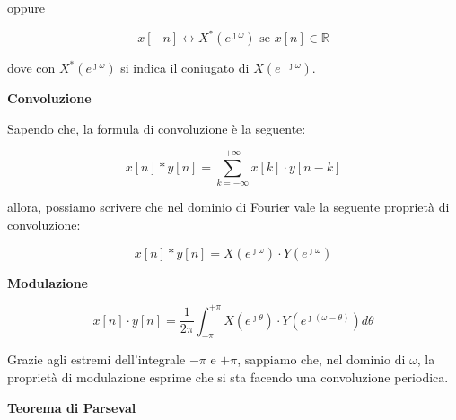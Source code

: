 oppure 

{
    \Large 
    \begin{equation}
        x \left[ -n\right]
        \leftrightarrow
        X^{*} \left(e^{\jmath \omega}\right) 
        \text{ se }
        x \left[ n\right] \in \mathbb{R}
    \end{equation}
}

dove con $X^{*} \left(e^{\jmath \omega}\right)$ si indica il coniugato di $X \left(e^{- \jmath \omega}\right)$. \newline 

\textbf{Convoluzione} \newline 

Sapendo che, la formula di convoluzione è la seguente: 

{
    \Large 
    \begin{equation}
        x \left[ n\right]
        * 
        y \left[ n\right] 
        = 
        \sum_{k = -\infty}^{+ \infty}
        x \left[ k\right] \cdot y \left[ n - k\right]
    \end{equation}
}

allora, possiamo scrivere che nel dominio di Fourier vale la seguente proprietà di convoluzione: 

{
    \Large 
    \begin{equation}
        x \left[ n\right]
        * 
        y \left[ n\right] 
        = 
        X \left( e^{\jmath \omega}\right) 
        \cdot 
        Y \left( e^{\jmath \omega}\right)  
    \end{equation}
}

\newpage 

\textbf{Modulazione} \newline 

{
    \Large 
    \begin{equation}
        x \left[ n\right]
        \cdot 
        y \left[ n\right] 
        = 
        \dfrac{1}{2 \pi} 
        \int_{-\pi}^{+ \pi}
        X \left( e^{\jmath \theta}\right)
        \cdot 
        Y \left( e^{\jmath \left( \omega - \theta\right)}\right)
        d\theta
    \end{equation}
}

Grazie agli estremi dell'integrale $-\pi$ e $+\pi$, 
sappiamo che, nel dominio di $\omega$, 
la proprietà di modulazione esprime che si sta facendo una convoluzione periodica. \newline 

\textbf{Teorema di Parseval} \label{teo: Teorema di Parseval}\newline 

